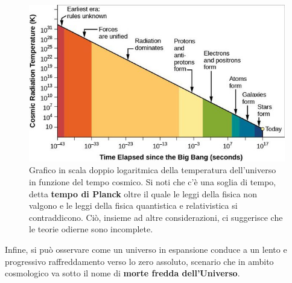 \documentclass[
10pt, %
a4paper, %
oneside, %
headinclude,footinclude, %
BCOR5mm, %
]{scrartcl}
\begin{document}
\begin{figure}[h!]
	\centering
	\includegraphics[width=0.6\linewidth]{../images/temperatura_universo}
	\caption{Grafico in scala doppio logaritmica della temperatura dell'universo in funzione del tempo cosmico. Si noti che c'è una soglia di tempo, detta \textbf{tempo di Planck} oltre il quale le leggi della fisica non valgono e le leggi della fisica quantistica e relativistica si contraddicono. Ciò, insieme ad altre considerazioni, ci suggerisce che le teorie odierne sono incomplete.}
	\label{fig:temperaturauniverso}
\end{figure}
\FloatBarrier
Infine, si può osservare come un universo in espansione conduce a un lento e progressivo
raffreddamento verso lo zero assoluto, scenario che in ambito cosmologico va sotto il nome
di\textbf{ morte fredda dell’Universo}.
\end{document}
